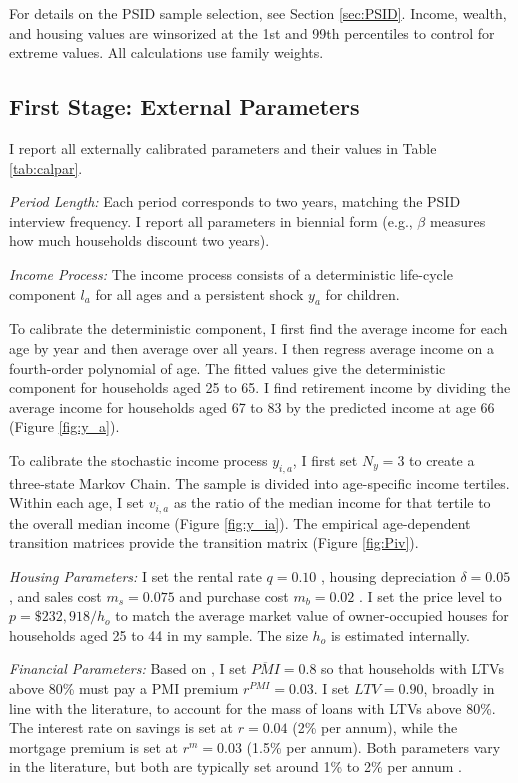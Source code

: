 \documentclass[12pt]{article}
\begin{document}
For details on the PSID sample selection, see Section \ref{sec:PSID}. Income, wealth, and housing values are winsorized at the 1st and 99th percentiles to control for extreme values. All calculations use family weights. 

\subsection{First Stage: External Parameters}
I report all externally calibrated parameters and their values in Table \ref{tab:calpar}.

\textit{Period Length:} Each period corresponds to two years, matching the PSID interview frequency. I report all parameters in biennial form (e.g., $\beta$ measures how much households discount two years).

\textit{Income Process:} The income process consists of a deterministic life-cycle component $l_a$ for all ages and a persistent shock $y_a$ for children. 

To calibrate the deterministic component, I first find the average income for each age by year and then average over all years. I then regress average income on a fourth-order polynomial of age. The fitted values give the deterministic component for households aged 25 to 65. I find retirement income by dividing the average income for households aged 67 to 83 by the predicted income at age 66 (Figure \ref{fig:y_a}). 

To calibrate the stochastic income process $y_{i,a}$, I first set $N_y=3$ to create a three-state Markov Chain. The sample is divided into age-specific income tertiles. Within each age, I set $v_{i,a}$ as the ratio of the median income for that tertile to the overall median income (Figure \ref{fig:y_ia}). The empirical age-dependent transition matrices provide the transition matrix (Figure \ref{fig:Piv}).

\textit{Housing Parameters:} I set the rental rate $q=0.10$ \citep{Davis2008}, housing depreciation $\delta=0.05$ \citep{Harding2007}, and sales cost $m_s=0.075$ and purchase cost $m_b=0.02$ \citep{Yang2009}. I set the price level to $p=\$232,918/h_o$ to match the average market value of owner-occupied houses for households aged 25 to 44 in my sample. The size $h_o$ is estimated internally.

\textit{Financial Parameters:} Based on \cite{goodman2017sixty}, I set $\overline{PMI}=0.8$ so that households with LTVs above 80\% must pay a PMI premium $r^{PMI}=0.03$. I set $LTV=0.90$, broadly in line with the literature, to account for the mass of loans with LTVs above 80\%. The interest rate on savings is set at $r = 0.04$ (2\% per annum), while the mortgage premium is set at $r^m=0.03$ (1.5\% per annum). Both parameters vary in the literature, but both are typically set around 1\% to 2\% per annum \citep[see e.g.,][]{Cocco2005b,Kaplan2020,Paz-Pardo2019}.
\end{document}
